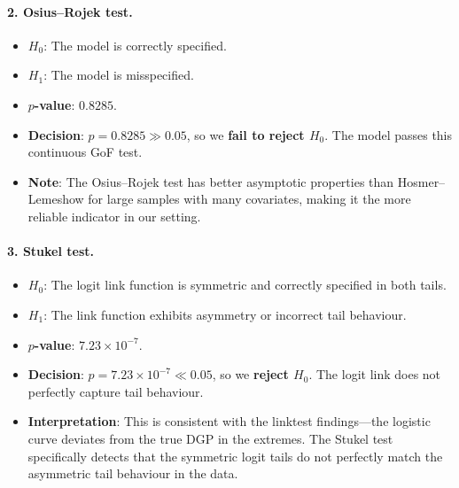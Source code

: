 \documentclass[12pt,a4paper]{article}
\begin{document}
\paragraph{2. Osius--Rojek test.}
\begin{itemize}
  \item $H_0$: The model is correctly specified.
  \item $H_1$: The model is misspecified.
  \item \textbf{$p$-value}: $0.8285$.
  \item \textbf{Decision}: $p = 0.8285 \gg 0.05$, so we \textbf{fail to reject $H_0$}. The model passes this continuous GoF test.
  \item \textbf{Note}: The Osius--Rojek test has better asymptotic properties than Hosmer--Lemeshow for large samples with many covariates, making it the more reliable indicator in our setting.
\end{itemize}

\paragraph{3. Stukel test.}
\begin{itemize}
  \item $H_0$: The logit link function is symmetric and correctly specified in both tails.
  \item $H_1$: The link function exhibits asymmetry or incorrect tail behaviour.
  \item \textbf{$p$-value}: $7.23 \times 10^{-7}$.
  \item \textbf{Decision}: $p = 7.23 \times 10^{-7} \ll 0.05$, so we \textbf{reject $H_0$}. The logit link does not perfectly capture tail behaviour.
  \item \textbf{Interpretation}: This is consistent with the linktest findings---the logistic curve deviates from the true DGP in the extremes. The Stukel test specifically detects that the symmetric logit tails do not perfectly match the asymmetric tail behaviour in the data.
\end{itemize}
\end{document}
